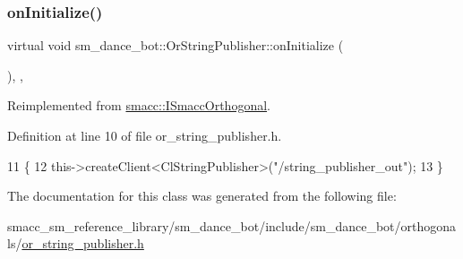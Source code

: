 \subsubsection{\texorpdfstring{on\+Initialize()}{onInitialize()}}
{\footnotesize\ttfamily virtual void sm\+\_\+dance\+\_\+bot\+::\+Or\+String\+Publisher\+::on\+Initialize (\begin{DoxyParamCaption}{ }\end{DoxyParamCaption})\hspace{0.3cm}{\ttfamily [inline]}, {\ttfamily [override]}, {\ttfamily [virtual]}}



Reimplemented from \hyperlink{classsmacc_1_1ISmaccOrthogonal_a6bb31c620cb64dd7b8417f8705c79c7a}{smacc\+::\+I\+Smacc\+Orthogonal}.



Definition at line 10 of file or\+\_\+string\+\_\+publisher.\+h.


\begin{DoxyCode}
11     \{
12         this->createClient<ClStringPublisher>(\textcolor{stringliteral}{"/string\_publisher\_out"});
13     \}
\end{DoxyCode}


The documentation for this class was generated from the following file\+:\begin{DoxyCompactItemize}
\item 
smacc\+\_\+sm\+\_\+reference\+\_\+library/sm\+\_\+dance\+\_\+bot/include/sm\+\_\+dance\+\_\+bot/orthogonals/\hyperlink{sm__dance__bot_2include_2sm__dance__bot_2orthogonals_2or__string__publisher_8h}{or\+\_\+string\+\_\+publisher.\+h}\end{DoxyCompactItemize}
